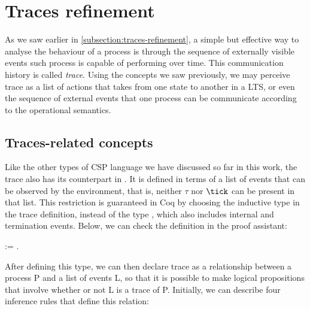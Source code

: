 \section{Traces refinement}
\label{section:traces}

As we saw earlier in \autoref{subsection:traces-refinement}, a simple but effective way to analyse the behaviour of a process is through the sequence of externally visible events such process is capable of performing over time. This communication history is called \emph{trace}. Using the concepts we saw previously, we may perceive trace as a list of actions that takes from one state to another in a LTS, or even the sequence of external events that one process can be communicate according to the operational semantics.

\subsection{Traces-related concepts}

Like the other types of CSP language we have discussed so far in this work, the trace also has its counterpart in \CSPcoq{}. It is defined in terms of a list of events that can be observed by the environment, that is, neither $ \tau $ nor $ \tick $ can be present in that list. This restriction is guaranteed in Coq by choosing the inductive type  in the trace definition, instead of the type , which also includes internal and termination events. Below, we can check the definition in the proof assistant:

\begin{coqdoccode}
	\coqdocnoindent
	  :=  .\coqdoceol
\end{coqdoccode}

After defining this type, we can then declare trace as a relationship between a process P and a list of events L, so that it is possible to make logical propositions that involve whether or not L is a trace of P. Initially, we can describe four inference rules that define this relation:

